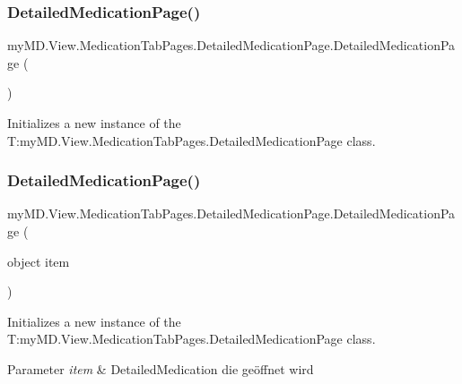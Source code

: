 \subsubsection{\texorpdfstring{Detailed\+Medication\+Page()}{DetailedMedicationPage()}\hspace{0.1cm}{\footnotesize\ttfamily [1/2]}}
{\footnotesize\ttfamily my\+M\+D.\+View.\+Medication\+Tab\+Pages.\+Detailed\+Medication\+Page.\+Detailed\+Medication\+Page (\begin{DoxyParamCaption}{ }\end{DoxyParamCaption})}



Initializes a new instance of the T\+:my\+M\+D.\+View.\+Medication\+Tab\+Pages.\+Detailed\+Medication\+Page class. 

\mbox{\label{classmy_m_d_1_1_view_1_1_medication_tab_pages_1_1_detailed_medication_page_a85fb3c6227ab81ef9b263263d76726b9}} 
\subsubsection{\texorpdfstring{Detailed\+Medication\+Page()}{DetailedMedicationPage()}\hspace{0.1cm}{\footnotesize\ttfamily [2/2]}}
{\footnotesize\ttfamily my\+M\+D.\+View.\+Medication\+Tab\+Pages.\+Detailed\+Medication\+Page.\+Detailed\+Medication\+Page (\begin{DoxyParamCaption}\item[{object}]{item }\end{DoxyParamCaption})}



Initializes a new instance of the T\+:my\+M\+D.\+View.\+Medication\+Tab\+Pages.\+Detailed\+Medication\+Page class. 


\begin{DoxyParams}{Parameter}
{\em item} & Detailed\+Medication die geöffnet wird\\
\hline
\end{DoxyParams}


